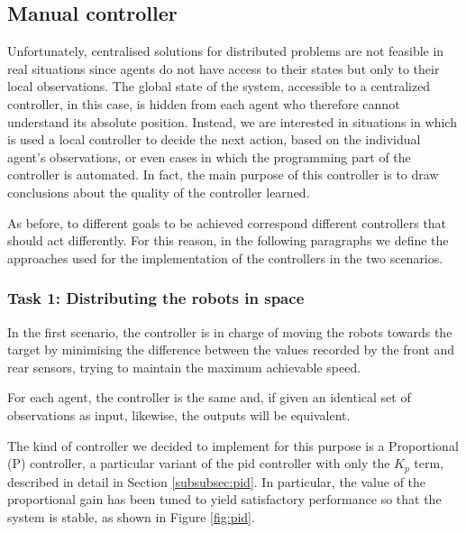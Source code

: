 \subsection{Manual controller}
\label{subsec:manual}

Unfortunately, centralised solutions for distributed problems are not feasible in 
real situations since agents do not have access to their states but only to their local 
observations. The global state of the system, accessible to a centralized controller, 
in this case, is hidden from each agent who therefore cannot understand its 
absolute position.
Instead, we are interested in situations in which is used a local controller to decide 
the next action, based on the individual agent's observations, or even cases in 
which the programming part of the controller is automated.
In fact, the main purpose of this controller is to draw conclusions about the 
quality of the controller learned.

As before, to different goals to be achieved correspond different controllers 
that should act differently. For this reason, in the following paragraphs we define 
the approaches used for the implementation of the controllers in the two 
scenarios.

\subsubsection{Task 1: Distributing the robots in space}
\label{subsubsec:manualtask1}
In the first scenario, the controller is in charge of moving the robots towards the 
target by minimising the difference between the values recorded by the front and 
rear sensors, trying to maintain the maximum achievable speed.

For each agent, the controller is the same and, if given an identical set of 
observations as input, likewise, the outputs will be equivalent.

The kind of controller we decided to implement for this purpose is a Proportional 
(P) controller, a particular variant of the \gls{pid} controller with only the $K_p$ 
term, described in detail in Section \ref{subsubsec:pid}. 
In particular, the value of the proportional gain has been tuned to yield 
satisfactory performance so that the system is stable, as shown in Figure 
\ref{fig:pid}. 


